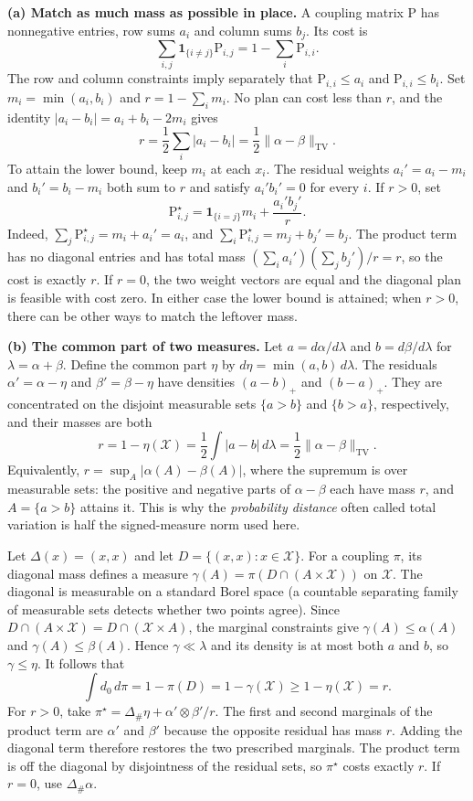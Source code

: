 \documentclass[11pt,a4paper]{article}
\theoremstyle{exostyle}
\newcommand{\push}{\#}
\newcommand{\X}{\mathcal X}
\begin{document}
\begin{solution}
\textbf{(a) Match as much mass as possible in place.}
A coupling matrix $\mathrm P$ has nonnegative entries, row sums $a_i$
and column sums $b_j$. Its cost is
\[
  \sum_{i,j}\mathbf 1_{\{i\ne j\}}\mathrm P_{i,j}
    =1-\sum_i\mathrm P_{i,i}.
\]
The row and column constraints imply separately that
$\mathrm P_{i,i}\le a_i$ and $\mathrm P_{i,i}\le b_i$.
Set $m_i=\min(a_i,b_i)$ and $r=1-\sum_i m_i$. No plan can cost less than
$r$, and the identity $|a_i-b_i|=a_i+b_i-2m_i$ gives
\[
  r=\frac12\sum_i|a_i-b_i|
    =\frac12\|\alpha-\beta\|_{\mathrm{TV}}.
\]
To attain the lower bound, keep $m_i$ at each $x_i$. The residual weights
$a_i'=a_i-m_i$ and $b_i'=b_i-m_i$ both sum to $r$ and satisfy
$a_i'b_i'=0$ for every $i$. If $r>0$, set
\[
  \mathrm P^\star_{i,j}=\mathbf 1_{\{i=j\}}m_i+\frac{a_i'b_j'}{r}.
\]
Indeed, $\sum_j\mathrm P^\star_{i,j}=m_i+a_i'=a_i$, and
$\sum_i\mathrm P^\star_{i,j}=m_j+b_j'=b_j$. The product term
has no diagonal entries and has total mass
$(\sum_i a_i')(\sum_j b_j')/r=r$, so the cost is exactly $r$.
If $r=0$, the two weight vectors are equal and the diagonal plan is
feasible with cost zero. In either case the lower bound is attained;
when $r>0$, there can be other ways to match the leftover mass.

\par{}
\textbf{(b) The common part of two measures.}
Let $a=d\alpha/d\lambda$ and $b=d\beta/d\lambda$ for
$\lambda=\alpha+\beta$. Define the common part $\eta$ by
$d\eta=\min(a,b)\,d\lambda$. The residuals $\alpha'=\alpha-\eta$
and $\beta'=\beta-\eta$ have densities $(a-b)_+$ and $(b-a)_+$.
They are concentrated on the disjoint measurable sets $\{a>b\}$
and $\{b>a\}$, respectively, and their masses are both
\[
  r=1-\eta(\X)=\frac12\int |a-b|\,d\lambda
               =\frac12\|\alpha-\beta\|_{\mathrm{TV}}.
\]
Equivalently, $r=\sup_{A}|\alpha(A)-\beta(A)|$, where the supremum is
over measurable sets: the positive and negative parts of $\alpha-\beta$
each have mass $r$, and $A=\{a>b\}$ attains it. This is why the
\emph{probability distance} often called total variation is half the
signed-measure norm used here.

Let $\Delta(x)=(x,x)$ and let $D=\{(x,x):x\in\X\}$.
For a coupling $\pi$, its diagonal mass defines a measure
$\gamma(A)=\pi(D\cap(A\times\X))$ on $\X$. The diagonal is measurable
on a standard Borel space (a countable separating family of measurable
sets detects whether two points agree). Since
$D\cap(A\times\X)=D\cap(\X\times A)$, the marginal constraints give
$\gamma(A)\le\alpha(A)$ and $\gamma(A)\le\beta(A)$.
Hence $\gamma\ll\lambda$ and its density is at most both $a$ and $b$,
so $\gamma\le\eta$. It follows that
\[
  \int d_0\,d\pi=1-\pi(D)=1-\gamma(\X)\ge 1-\eta(\X)=r .
\]
For $r>0$, take $\pi^\star=\Delta_\push\eta+\alpha'\otimes\beta'/r$.
The first and second marginals of the product term are $\alpha'$ and
$\beta'$ because the opposite residual has mass $r$. Adding the
diagonal term therefore restores the two prescribed marginals.
The product term is off the diagonal by disjointness of the residual
sets, so $\pi^\star$ costs exactly $r$. If $r=0$, use $\Delta_\push\alpha$.


\end{solution}
\end{document}
